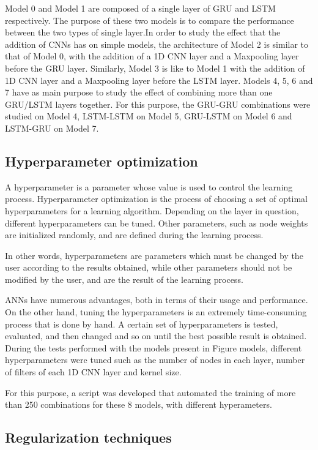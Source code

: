 Model 0 and Model 1 are composed of a single layer of \ac{GRU} and \ac{LSTM} respectively. The purpose of these two models is to compare the performance between the two types of single layer.In order to study the effect that the addition of \ac{CNN}s has on simple models, the architecture of Model 2 is similar to that of Model 0, with the addition of a \ac{1D CNN} layer and a Maxpooling layer before the \ac{GRU} layer. Similarly, Model 3 is like to Model 1 with the addition of \ac{1D CNN} layer and a Maxpooling layer before the \ac{LSTM} layer. Models 4, 5, 6 and 7 have as main purpose to study the effect of combining more than one \ac{GRU}/\ac{LSTM} layers together. For this purpose, the \ac{GRU}-\ac{GRU} combinations were studied on Model 4, \ac{LSTM}-\ac{LSTM} on Model 5, \ac{GRU}-\ac{LSTM} on Model 6 and \ac{LSTM}-\ac{GRU} on Model 7.


\subsection{Hyperparameter optimization}

A hyperparameter is a parameter whose value is used to control the learning process. Hyperparameter optimization is the process of choosing a set of optimal hyperparameters for a learning algorithm. Depending on the layer in question, different hyperparameters can be tuned. Other parameters, such as node weights are initialized randomly, and are defined during the learning process.

In other words, hyperparameters are parameters which must be changed by the user according to the results obtained, while other parameters should not be modified by the user, and are the result of the learning process.


\ac{ANN}s have numerous advantages, both in terms of their usage and performance. On the other hand, tuning the hyperparameters is an extremely time-consuming process that is done by hand. A certain set of hyperparameters is tested, evaluated, and then changed and so on until the best possible result is obtained. During the tests performed with the models present in Figure {models}, different hyperparameters were tuned such as the number of nodes in each layer, number of filters of each \ac{1D CNN} layer and kernel size. 

For this purpose, a script was developed that automated the training of more than 250 combinations for these 8 models, with different hyperameters. 


\subsection{Regularization techniques}

